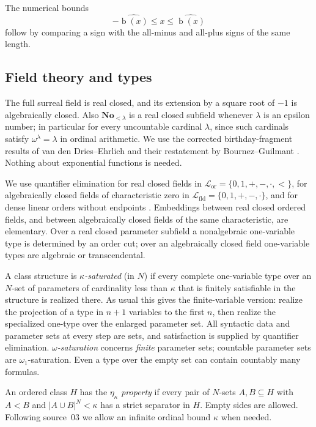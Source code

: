 \documentclass[11pt,letterpaper]{article}
\numberwithin{equation}{section}
\theoremstyle{definition}
\theoremstyle{remark}
\newcommand{\No}{\mathbf{No}}
\newcommand{\bd}{\operatorname{b}}
\newcommand{\Lang}{\mathcal L}
\newcommand{\abs}[1]{\lvert#1\rvert}
\newcommand{\hatord}[1]{\widehat{#1}}
\begin{document}
The numerical bounds
\begin{equation}\label{univ:eq:birthbounds}
 -\hatord{\bd(x)}\leq x\leq\hatord{\bd(x)}
\end{equation}
follow by comparing a sign with the all-minus and all-plus signs of the same
length.

\subsection{Field theory and types}

The full surreal field is real closed, and its extension by a square root of
$-1$ is algebraically closed. Also $\No_{<\lambda}$ is a real closed subfield
whenever $\lambda$ is an epsilon number; in particular for every uncountable
cardinal $\lambda$, since such cardinals satisfy $\omega^\lambda=\lambda$ in
ordinal arithmetic. We use the corrected birthday-fragment results of van den
Dries--Ehrlich and their restatement by Bournez--Guilmant
\cite{vdDE,vdDEerr,BournezGuilmant}. Nothing about exponential functions is
needed.

We use quantifier elimination for real closed fields in
$\Lang_{\mathrm{or}}=\{0,1,+,-,\cdot,<\}$, for algebraically closed fields of
characteristic zero in $\Lang_{\mathrm{fld}}=\{0,1,+,-,\cdot\}$, and for dense
linear orders without endpoints \cite{Marker}. Embeddings between real closed
ordered fields, and between algebraically closed fields of the same
characteristic, are elementary. Over a real closed parameter subfield a
nonalgebraic one-variable type is determined by an order cut; over an
algebraically closed field one-variable types are algebraic or
transcendental.

A class structure is \emph{$\kappa$-saturated} (in $N$) if every complete
one-variable type over an $N$-set of parameters of cardinality less than
$\kappa$ that is finitely satisfiable in the structure is realized there. As
usual this gives the finite-variable version: realize the projection of a
type in $n+1$ variables to the first $n$, then realize the specialized
one-type over the enlarged parameter set. All syntactic data and parameter
sets at every step are sets, and satisfaction is supplied by quantifier
elimination. \emph{$\omega$-saturation} concerns \emph{finite} parameter sets;
countable parameter sets are $\omega_1$-saturation. Even a type over the empty
set can contain countably many formulas.

An ordered class $H$ has the \emph{$\eta_\kappa$ property} if every pair of
$N$-sets $A,B\subseteq H$ with $A<B$ and $\abs{A\cup B}^N<\kappa$ has a strict
separator in $H$. Empty sides are allowed. Following source~03 we allow an
infinite ordinal bound $\kappa$ when needed.
\end{document}

